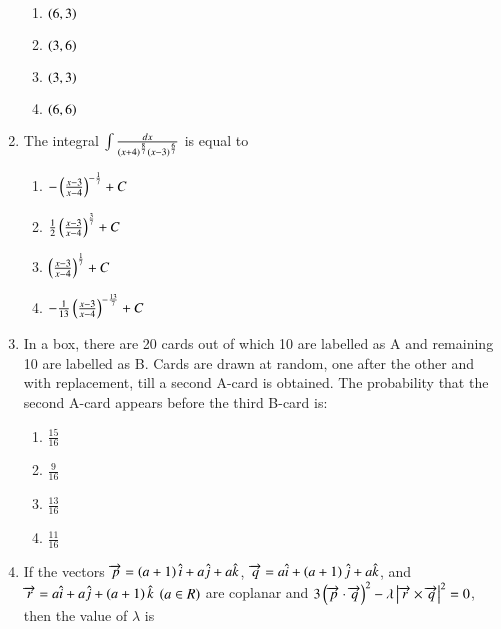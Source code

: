\documentclass[journal,12pt,twocolumn]{IEEEtran}
\theoremstyle{remark}
\begin{document}
\begin{enumerate}
        \begin{multicols}{4}
            \begin{enumerate}
                \item $\left(6, 3\right)$
                \item $\left(3, 6\right)$
                \item $\left(3, 3\right)$
                \item $\left(6, 6\right)$
            \end{enumerate}
        \end{multicols}

    \item The integral $\int\frac{dx}{\left(x+4\right)^{\frac{8}{7}}\left(x-3\right)^{\frac{6}{7}}}$ is equal to

		\begin{multicols}{2}
			\begin{enumerate}
				\item $-\left(\frac{x-3}{x-4}\right)^{-\frac{1}{7}}+C$
				\item $\frac{1}{2}\left(\frac{x-3}{x-4}\right)^{\frac{3}{7}}+C$
				\item $\left(\frac{x-3}{x-4}\right)^{\frac{1}{7}}+C$
				\item $-\frac{1}{13}\left(\frac{x-3}{x-4}\right)^{-\frac{13}{7}}+C$
			\end{enumerate}
		\end{multicols}

    \item In a box, there are 20 cards out of which 10 are labelled as A and remaining 10 are labelled as B. Cards are drawn at random, one after the other and with replacement, till a second A-card is obtained. The probability that the second A-card appears before the third B-card is:

		\begin{multicols}{4}
			\begin{enumerate}
				\item $\frac{15}{16}$
				\item $\frac{9}{16}$
				\item $\frac{13}{16}$
				\item $\frac{11}{16}$
			\end{enumerate}
		\end{multicols}

    \item If the vectors $\overrightarrow{p} = \left(a+1\right)\hat{i}+a\hat{j}+a\hat{k}$, $\overrightarrow{q} = a\hat{i}+\left(a+1\right)\hat{j}+a\hat{k}$, and $\overrightarrow{r} = a\hat{i}+a\hat{j}+\left(a+1\right)\hat{k}$ $\left(a\in R\right)$ are coplanar and $3\left(\overrightarrow{p}\cdot\overrightarrow{q}\right)^2 - \lambda\left\vert\overrightarrow{r}\times \overrightarrow{q}\right\vert^2=0$, then the value of $\lambda$ is


\end{enumerate}
\end{document}
